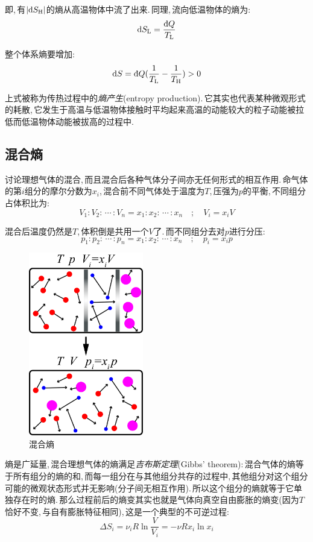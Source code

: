 即,\,有$|\textrm{d} S_{\rm H}|$的熵从高温物体中流了出来.\,同理,\,流向低温物体的熵为:
\[\ud S_{\rm L}=\frac{\dbar Q}{T_{\rm L}}\]

整个体系熵要增加:
\[\ud S=\dbar Q(\frac{1}{T_{\rm L}}-\frac{1}{T_{\rm H}})> 0\]

上式被称为传热过程中的\emph{熵产生}(entropy production).\,它其实也代表某种微观形式的耗散,\,它发生于高温与低温物体接触时平均起来高温的动能较大的粒子动能被拉低而低温物体动能被拔高的过程中.

\subsection{混合熵}

讨论理想气体的混合,\,而且混合后各种气体分子间亦无任何形式的相互作用.\,命气体的第$i$组分的摩尔分数为$x_i$,\,混合前不同气体处于温度为$T$,\,压强为$p$的平衡,\,不同组分占体积比为:
\[V_1:V_2:\,\cdots\, :V_n=x_1:x_2:\,\cdots\,:x_n\quad ; \quad V_i=x_i V\]

混合后温度仍然是$T$,\,体积倒是共用一个$V$了.\,而不同组分去对$p$进行分压:
\[p_1:p_2:\,\cdots\, :p_n=x_1:x_2:\,\cdots\,:x_n\quad ; \quad p_i=x_i p\]

\begin{figure}
\centering
\vspace{-0.5cm}
\includegraphics[width=5cm]{image/5-2-16.png}
\caption{混合熵}
\end{figure}
熵是广延量,\,混合理想气体的熵满足\emph{吉布斯定理}(Gibbs' theorem):\,混合气体的熵等于所有组分的熵的和,\,而每一组分在与其他组分共存的过程中,\,其他组分对这个组分可能的微观状态形式并无影响(分子间无相互作用).\,所以这个组分的熵就等于它单独存在时的熵.\,那么过程前后的熵变其实也就是气体向真空自由膨胀的熵变(因为$T$恰好不变,\,与自有膨胀特征相同),\,这是一个典型的不可逆过程:
\[\Delta S_i=\nu_i R\ln\frac{V}{V_i}=-\nu R x_i\ln x_i\]

